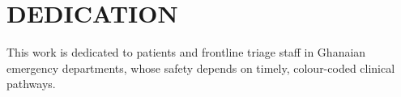 \chapter*{DEDICATION}

This work is dedicated to patients and frontline triage staff in Ghanaian emergency departments, whose safety depends on timely, colour-coded clinical pathways.
